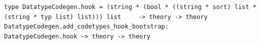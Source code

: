 \begin{isabellebody}
\begin{isamarkuptext}
\begin{mldecls}
  \verb|type DatatypeCodegen.hook = (string * (bool * ((string * sort) list * (string * typ list) list))) list|\isasep\isanewline%
\verb|    -> theory -> theory| \\
  \verb|DatatypeCodegen.add_codetypes_hook_bootstrap: |\isasep\isanewline%
\verb|      DatatypeCodegen.hook -> theory -> theory|
  \end{mldecls}%
\end{isamarkuptext}%
\isamarkuptrue%
%
\endisatagmlref
{\isafoldmlref}%
%
\isadelimmlref
%
\endisadelimmlref
%
\begin{isamarkuptext}%
\fixme
\end{isamarkuptext}%
\isamarkuptrue%
%
\isadelimtheory
%
\endisadelimtheory
%
\isatagtheory
{}\isamarkupfalse%
%
\endisatagtheory
{\isafoldtheory}%
%
\isadelimtheory
%
\endisadelimtheory
\isanewline
\end{isabellebody}%
